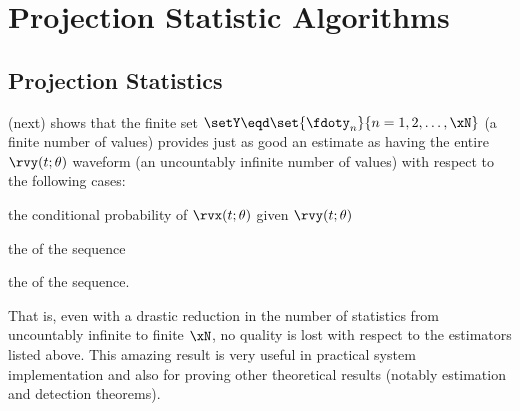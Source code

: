 \chapter{Projection Statistic Algorithms}  %
\section{Projection Statistics}
 (next) shows that the finite set
$\setY\eqd\set{\fdoty_n}{n=1,2,\ldots,\xN}$ (a finite number of values) provides just as
good an estimate as having the entire $\rvy(t;\theta)$ waveform
(an uncountably infinite number of values)
with respect to the following cases:
\begin{enume}
   \item the conditional probability of $\rvx(t;\theta)$ given $\rvy(t;\theta)$
   \item the  of the sequence
   \item the   of the sequence.
\end{enume}
That is, even with a drastic reduction in the number of statistics
from uncountably infinite to finite $\xN$,
no quality is lost with respect to the estimators listed above.
This amazing result is very useful in practical system implementation
and also for proving other theoretical results
(notably estimation and detection theorems).


